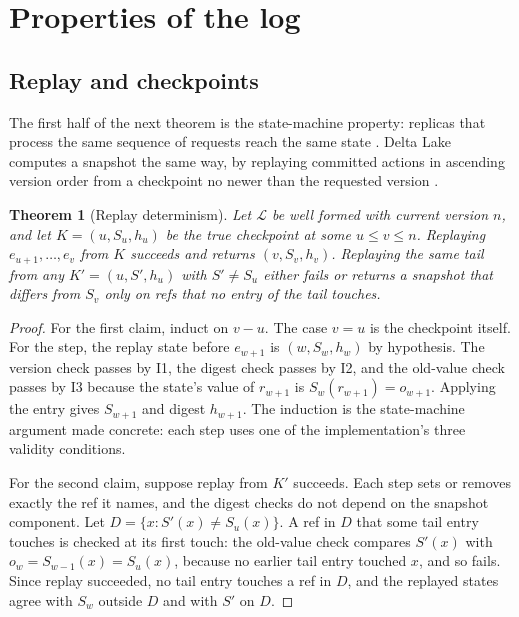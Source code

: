 \documentclass[11pt,letterpaper]{article}
\newtheorem{theorem}{Theorem}[section]
\theoremstyle{definition}
\theoremstyle{remark}
\newcommand{\Snap}[1]{S_{#1}}
\newcommand{\Log}{\mathcal{L}}
\begin{document}
\section{Properties of the log}
\label{sec:tlsc:log}

\subsection{Replay and checkpoints}

The first half of the next theorem is the state-machine property: replicas that process the same sequence of requests reach the same state \cite{schneider1990}. Delta Lake computes a snapshot the same way, by replaying committed actions in ascending version order from a checkpoint no newer than the requested version \cite{deltaprotocol}.

\begin{theorem}[Replay determinism]
\label{thm:tlsc:replay}
Let $\Log$ be well formed with current version $n$, and let $K=(u,\Snap{u},h_u)$ be the true checkpoint at some $u\leq v\leq n$. Replaying $e_{u+1},\dots,e_v$ from $K$ succeeds and returns $(v,\Snap{v},h_v)$. Replaying the same tail from any $K'=(u,S',h_u)$ with $S'\neq\Snap{u}$ either fails or returns a snapshot that differs from $\Snap{v}$ only on refs that no entry of the tail touches.
\end{theorem}

\begin{proof}
For the first claim, induct on $v-u$. The case $v=u$ is the checkpoint itself. For the step, the replay state before $e_{w+1}$ is $(w,\Snap{w},h_w)$ by hypothesis. The version check passes by I1, the digest check passes by I2, and the old-value check passes by I3 because the state's value of $r_{w+1}$ is $\Snap{w}(r_{w+1})=o_{w+1}$. Applying the entry gives $\Snap{w+1}$ and digest $h_{w+1}$. The induction is the state-machine argument made concrete: each step uses one of the implementation's three validity conditions.

For the second claim, suppose replay from $K'$ succeeds. Each step sets or removes exactly the ref it names, and the digest checks do not depend on the snapshot component. Let $D=\{x : S'(x)\neq\Snap{u}(x)\}$. A ref in $D$ that some tail entry touches is checked at its first touch: the old-value check compares $S'(x)$ with $o_w=\Snap{w-1}(x)=\Snap{u}(x)$, because no earlier tail entry touched $x$, and so fails. Since replay succeeded, no tail entry touches a ref in $D$, and the replayed states agree with $\Snap{w}$ outside $D$ and with $S'$ on $D$.
\end{proof}
\end{document}
